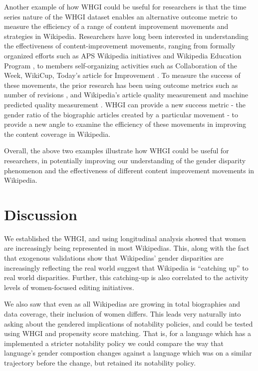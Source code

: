 \documentclass{sig-alternate-05-2015}
\begin{document}
Another example of how WHGI could be useful for researchers is that the time series nature of the WHGI dataset enables an alternative outcome metric to measure the efficiency of a range of content improvement movements and strategies in Wikipedia. Researchers have long been interested in understanding the effectiveness of content-improvement movements, ranging from formally organized efforts such as APS Wikipedia initiatives \cite{farzan_wikipedia_2013} and Wikipedia Education Program \cite{warncke-wang_success_2015}, to members self-organizing activities such as Collaboration of the Week, WikiCup, Today's article for Improvement \cite{zhu_organizing_2012}\cite{warncke-wang_success_2015}. To measure the success of these movements, the prior research has been using outcome metrics such as number of revisions \cite{zhu_organizing_2012}\cite{farzan_wikipedia_2013}, and Wikipedia's article quality measurement and machine predicted quality measurement \cite{warncke-wang_success_2015}. WHGI can provide a new success metric - the gender ratio of the biographic articles created by a particular movement - to provide a new angle to examine the efficiency of these movements in improving the content coverage in Wikipedia.

Overall, the above two examples illustrate how WHGI could be useful for researchers, in potentially improving our understanding of the gender disparity phenomenon and the effectiveness of different content improvement movements in Wikipedia.

   
\section{Discussion}
We established the WHGI, and using longitudinal analysis showed that women are increasingly being represented in most Wikipedias. This, along with the fact that exogenous validations show that Wiki\-pedias' gender disparities are increasingly reflecting the real world suggest that Wikipedia is ``catching up'' to real world disparities. Further, this catching-up is also correlated to the activity levels of women-focused editing initiatives.

We also saw that even as all Wikipedias are growing in total biographies and data coverage, their inclusion of women differs. This leads very naturally into asking about the gendered implications of notability policies, and could be tested using WHGI and propensity score matching. That is, for a language which has a implemented a stricter notability policy we could compare the way that language's gender compostion changes against a language which was on a similar trajectory before the change, but retained its notability policy.
\end{document}
